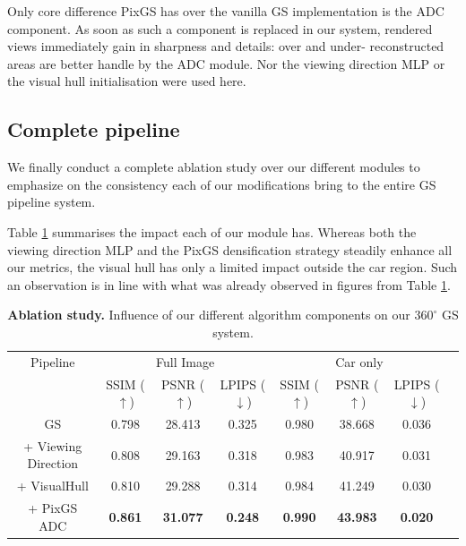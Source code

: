 Only core difference PixGS has over the vanilla GS implementation is the \ac{ADC} component. As soon as such a component is replaced in our system, rendered views immediately gain in sharpness and details: over and under- reconstructed areas are better handle by the \ac{ADC} module. Nor the viewing direction MLP or the visual hull initialisation were used here. 

\subsection{Complete pipeline}

We finally conduct a complete ablation study over our different modules to emphasize on the consistency each of our modifications bring to the entire GS pipeline system. 

Table \ref{table:gs-abaltion} summarises the impact each of our module has. Whereas both the viewing direction MLP and the PixGS densification strategy steadily enhance all our metrics, the visual hull has only a limited impact outside the car region. Such an observation is in line with what was already observed in figures from Table \ref{table:gs-abaltion}. 

\begin{table}[htp!]
  \caption{\textbf{Ablation study.} Influence of our different algorithm components on our $360^{\circ}$ GS system.}
  \label{table:gs-abaltion}
  \begin{adjustbox}{width=\linewidth}
  \begin{tabular}[h]{c||ccccccc}
  \hline
   Pipeline & \multicolumn{3}{c}{Full Image} & \multicolumn{3}{c}{Car only} \\
   &  SSIM ($\uparrow$) & PSNR ($\uparrow$) & LPIPS ($\downarrow$) & SSIM ($\uparrow$) & PSNR ($\uparrow$) & LPIPS ($\downarrow$)\\
  \hline
  GS \cite{kerbl20233d}  & 0.798  & 28.413 & 0.325 & 0.980 & 38.668 & 0.036 \\
  + Viewing Direction & 0.808 & 29.163 & 0.318 & 0.983 & 40.917  & 0.031 \\
  + VisualHull & 0.810 & 29.288 & 0.314 & 0.984 &41.249  & 0.030 \\
  + PixGS \ac{ADC} & \textbf{0.861} & \textbf{31.077} & \textbf{0.248} & \textbf{0.990} & \textbf{43.983} & \textbf{0.020} \\
  \hline 
  \end{tabular}
  \end{adjustbox}
  \end{table}

